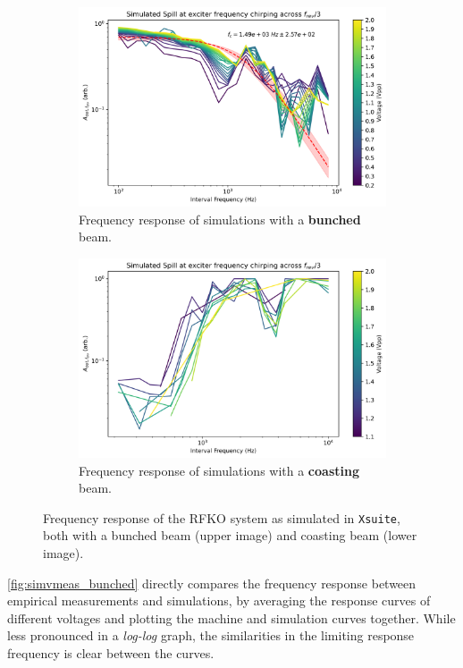 \documentclass[11pt]{report}
\begin{document}
\begin{figure}[h]
  \centering
  \begin{subfigure}[b]{0.9\linewidth}
    \includegraphics*[width=\linewidth]{sim_rf_on.png}
    \caption{Frequency response of simulations with a \textbf{bunched} beam.}\label{sim_rf_on}
  \end{subfigure}
  \begin{subfigure}[b]{0.9\linewidth}
    \includegraphics*[width=\linewidth]{sim_rf_off.png}
    \caption{Frequency response of simulations with a \textbf{coasting} beam.}\label{sim_rf_off}
  \end{subfigure}
  \cprotect\caption{Frequency response of the RFKO system as simulated in \verb|Xsuite|, both with a bunched beam (upper image) and coasting beam (lower image).}\label{fig:freq_response_sim}
\end{figure}

\autoref{fig:simvmeas_bunched} directly compares the frequency response between empirical measurements and simulations, by averaging the response curves of different voltages and plotting the machine and simulation curves together. While less pronounced in a \textit{log-log} graph, the similarities in the limiting response frequency is clear between the curves. 
\end{document}
